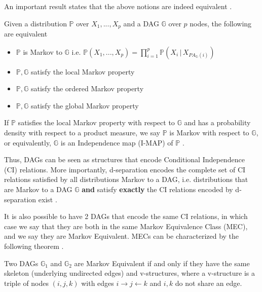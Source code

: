 \documentclass{tufte-book}
\begin{document}
An important result states that the above notions are indeed equivalent \cite{duarte-2020-algeb-geomet}.

\begin{theorem}\label{thm:markovdag}
Given a distribution $\mathbb{P}$ over $X_1,...,X_p$ and a DAG $\mathbb{G}$ over $p$ nodes, the following are equivalent

\begin{itemize}
\item $\mathbb{P}$ is Markov to $\mathbb{G}$ i.e. $\mathbb{P}(X_1,...,X_p) = \prod_{i=1}^p \mathbb{P}(X_i \, |\, X_{PA_{\mathbb{G}}(i)})$
\item $\mathbb{P}, \mathbb{G}$ satisfy the local Markov property
\item $\mathbb{P}, \mathbb{G}$ satisfy the ordered Markov property
\item $\mathbb{P}, \mathbb{G}$ satisfy the global Markov property
\end{itemize}

\end{theorem}


If \(\mathbb{P}\) satisfies the local Markov property with respect to \(\mathbb{G}\) and has a probability density with respect to a product measure, we say \(\mathbb{P}\) is Markov with respect to \(\mathbb{G}\), or equivalently, \(\mathbb{G}\) is an Independence map (I-MAP) of \(\mathbb{P}\) \cite{lauritzen-1996-graph}.

Thus, DAGs can be seen as structures that encode Conditional Independence (CI) relations. More importantly, d-separation encodes the complete set of CI relations satisfied by all distributions Markov to a DAG, i.e. distributions that are Markov to a DAG \(\mathbb{G}\) \textbf{and} satisfy \textbf{exactly} the CI relations encoded by d-separation exist \cite{meek-1995-stron-compl,geiger-1990-ident-indep}.

It is also possible to have 2 DAGs that encode the same CI relations, in which case we say that they are both in the same Markov Equivalence Class (MEC), and we say they are Markov Equivalent. MECs can be characterized by the following theorem \cite{verma-2013-equiv-causal-model}.

\begin{theorem}\label{thm:vermapearl}
Two DAGs $\mathbb{G}_1$ and $\mathbb{G}_2$ are Markov Equivalent if and only if they have the same skeleton (underlying undirected edges) and v-structures, where a v-structure is a triple of nodes $(i,j,k)$ with edges $i \rightarrow j \leftarrow k$ and $i,k$ do not share an edge.
\end{theorem}
\end{document}
